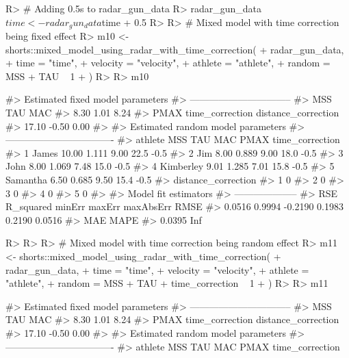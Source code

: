 \documentclass[
]{jss}
\begin{document}
\begin{CodeChunk}
\begin{CodeInput}
R> # Adding 0.5s to radar_gun_data
R> radar_gun_data$time <- radar_gun_data$time + 0.5
R> 
R> # Mixed model with time correction being fixed effect
R> m10 <- shorts::mixed_model_using_radar_with_time_correction(
+   radar_gun_data,
+   time = "time",
+   velocity = "velocity",
+   athlete = "athlete",
+   random = MSS + TAU ~ 1
+ )
R> 
R> m10
\end{CodeInput}
\begin{CodeOutput}
#> Estimated fixed model parameters
#> --------------------------------
#>                 MSS                 TAU                 MAC 
#>                8.30                1.01                8.24 
#>                PMAX     time_correction distance_correction 
#>               17.10               -0.50                0.00 
#> 
#> Estimated random model parameters
#> ----------------------------------
#>     athlete   MSS   TAU  MAC PMAX time_correction
#> 1     James 10.00 1.111 9.00 22.5            -0.5
#> 2       Jim  8.00 0.889 9.00 18.0            -0.5
#> 3      John  8.00 1.069 7.48 15.0            -0.5
#> 4 Kimberley  9.01 1.285 7.01 15.8            -0.5
#> 5  Samantha  6.50 0.685 9.50 15.4            -0.5
#>   distance_correction
#> 1                   0
#> 2                   0
#> 3                   0
#> 4                   0
#> 5                   0
#> 
#> Model fit estimators
#> --------------------
#>       RSE R_squared    minErr    maxErr maxAbsErr      RMSE 
#>    0.0516    0.9994   -0.2190    0.1983    0.2190    0.0516 
#>       MAE      MAPE 
#>    0.0395       Inf
\end{CodeOutput}
\begin{CodeInput}
R> 
R> 
R> # Mixed model with time correction being random effect
R> m11 <- shorts::mixed_model_using_radar_with_time_correction(
+   radar_gun_data,
+   time = "time",
+   velocity = "velocity",
+   athlete = "athlete",
+   random = MSS + TAU + time_correction ~ 1
+ )
R> 
R> m11
\end{CodeInput}
\begin{CodeOutput}
#> Estimated fixed model parameters
#> --------------------------------
#>                 MSS                 TAU                 MAC 
#>                8.30                1.01                8.24 
#>                PMAX     time_correction distance_correction 
#>               17.10               -0.50                0.00 
#> 
#> Estimated random model parameters
#> ----------------------------------
#>     athlete   MSS   TAU  MAC PMAX time_correction

\end{CodeOutput}
\end{CodeChunk}
\end{document}
